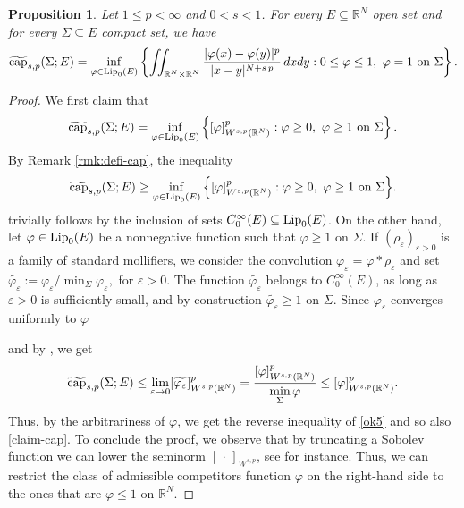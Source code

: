 \documentclass{amsart}
\newtheorem{proposition}[theorem]{Proposition}
\theoremstyle{definition}
\numberwithin{equation}{section}
\begin{document}
\begin{proposition} \label{prop:equivalent-cap}
	Let $1 \le p < \infty$ and $0 < s < 1$. For every $E \subseteq \mathbb{R}^N$ open set and for every $\Sigma \subseteq E$ compact set, we have
	\[
	\widetilde{{\rm cap}}_{s,p}(\Sigma; E) = \inf_{\varphi \in {\rm Lip}_0(E)}\left\{\iint_{\mathbb{R}^N \times \mathbb{R}^N} \frac{|\varphi(x) - \varphi(y)|^{p}}{|x-y|^{N+s\,p}}\,dxdy : 0 \le \varphi \le 1, \,\, \varphi=1 \mbox{ {\rm on }}\Sigma \right\}. 
	\]   
\end{proposition}
\begin{proof}
	We first claim that 
	\begin{equation} \label{claim-cap}
		\widetilde{{\rm cap}}_{s,p}(\Sigma; E) = \inf_{\varphi \in {\rm Lip}_0(E)}\left\{[\varphi]^p_{W^{s,p}(\mathbb{R}^N)}: \varphi \ge 0,\,\, \varphi \ge 1 \mbox{ on } \Sigma \right\}.
	\end{equation}
	By Remark \ref{rmk:defi-cap}, the inequality
	\begin{equation} \label{ok5}
		\widetilde{{\rm cap}}_{s,p}(\Sigma; E) \ge \inf_{\varphi \in {\rm Lip}_0(E)}\Big\{[\varphi]^p_{W^{s,p}(\mathbb{R}^N)} : \varphi \ge 0,\,\, \varphi \ge 1 \mbox{ on }\Sigma \Big\}.
	\end{equation}
	trivially follows by the inclusion of sets $C^\infty_0(E) \subseteq {\rm Lip}_0(E)$. On the other hand, let $\varphi \in {\rm Lip}_0(E)$ be a nonnegative function such that $\varphi \ge 1$ on $\Sigma$. If $(\rho_\varepsilon)_{\varepsilon > 0}$ is a family of standard mollifiers, we consider the convolution $\varphi_\varepsilon = \varphi \ast \rho_\varepsilon$ and set 
	$
	\widetilde{\varphi_\varepsilon} := \varphi_{\varepsilon}/ \min_{\Sigma} \varphi_\varepsilon, 
	$
	for $\varepsilon > 0.$
	The function $\widetilde{\varphi_\varepsilon}$ belongs to $C^\infty_0(E)$, as long as $\varepsilon > 0$ is sufficiently small, and by construction $\widetilde{\varphi_\varepsilon} \ge 1$ on $\Sigma.$
	Since $\varphi_{\varepsilon}$ converges uniformly  to $\varphi$ 

	and by \cite[Lemma 11]{FSV}, we get 
	\[
	\widetilde{{\rm cap}}_{s,p}(\Sigma; E) \le \lim_{\varepsilon \to 0} [\widetilde{\varphi_\varepsilon}]^p_{W^{s,p}(\mathbb{R}^N)} = \dfrac{[\varphi]^p_{W^{s,p}(\mathbb{R}^N)}}{ \displaystyle \min_{\Sigma} \varphi} \le [\varphi]^p_{W^{s,p}(\mathbb{R}^N)}.
	\]
	Thus, by the arbitrariness of $\varphi$, we get the reverse inequality of \eqref{ok5} and so also \eqref{claim-cap}. To conclude the proof, we observe that by truncating a Sobolev function we can lower the seminorm $[\,\cdot\,]_{W^{s,p}}$, see \cite[Lemma 2.7]{Warma} for instance. Thus, we can restrict the class of admissible competitors function $\varphi$ on the right-hand side to the ones that are $\varphi \le 1$ on $\mathbb{R}^N$.
\end{proof}	
\end{document}
